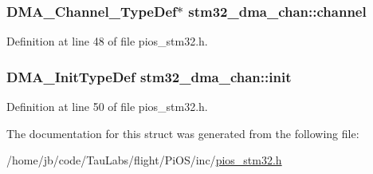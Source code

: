 \hypertarget{structstm32__dma__chan_a83c74feec82b3ebc787cab90df6b2264}{
\subsubsection[{channel}]{\setlength{\rightskip}{0pt plus 5cm}\-D\-M\-A\-\_\-\-Channel\-\_\-\-Type\-Def$\ast$ {\bf stm32\-\_\-dma\-\_\-chan\-::channel}}}\label{structstm32__dma__chan_a83c74feec82b3ebc787cab90df6b2264}


\-Definition at line 48 of file pios\-\_\-stm32.\-h.

\hypertarget{structstm32__dma__chan_a26b43c1f3ac4595c61a12d5bf54c39fb}{
\subsubsection[{init}]{\setlength{\rightskip}{0pt plus 5cm}\-D\-M\-A\-\_\-\-Init\-Type\-Def {\bf stm32\-\_\-dma\-\_\-chan\-::init}}}\label{structstm32__dma__chan_a26b43c1f3ac4595c61a12d5bf54c39fb}


\-Definition at line 50 of file pios\-\_\-stm32.\-h.



\-The documentation for this struct was generated from the following file\-:\begin{DoxyCompactItemize}
\item 
/home/jb/code/\-Tau\-Labs/flight/\-Pi\-O\-S/inc/\hyperlink{pios__stm32_8h}{pios\-\_\-stm32.\-h}\end{DoxyCompactItemize}
